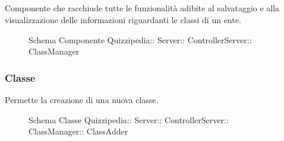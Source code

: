 \subsection{}
Componente che racchiude tutte le funzionalità adibite al salvataggio e alla visualizzazione delle informazioni riguardanti le classi di un ente.
\begin{figure}[H]
\centering
\noindent{}
\caption[Schema Componente Quizzipedia::Server::ControllerServer::ClassManager]{Schema Componente Quizzipedia:: Server:: ControllerServer:: ClassManager}
\end{figure}
\subsubsection{Classe }
Permette la creazione di una nuova classe.
\begin{figure}[H]
\centering
\noindent{}
\caption[Schema Classe ClassAdder]{Schema Classe Quizzipedia:: Server:: ControllerServer:: ClassManager:: ClassAdder}
\end{figure}
